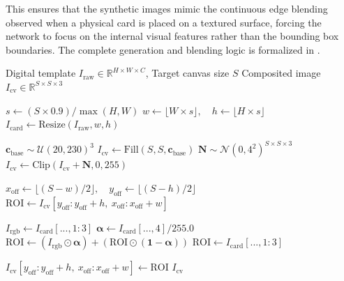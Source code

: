 This ensures that the synthetic images mimic the continuous edge blending observed when a physical card is placed on a textured surface, forcing the network to focus on the internal visual features rather than the bounding box boundaries. The complete generation and blending logic is formalized in .
\begin{algorithm}[htbp]
    \caption{Stochastic Background Generation and Alpha Compositing}
    \label{alg:alpha_blend}
    \begin{algorithmic}[1]
    \Require Digital template $I_{\text{raw}} \in \mathbb{R}^{H \times W \times C}$, Target canvas size $S$
    \Ensure Composited image $I_{\text{cv}} \in \mathbb{R}^{S \times S \times 3}$

    \State $s \gets (S \times 0.9) / \max(H, W)$ 
    \State $w \gets \lfloor W \times s \rfloor, \quad h \gets \lfloor H \times s \rfloor$
    \State $I_{\text{card}} \gets \text{Resize}(I_{\text{raw}}, w, h)$

    \State $\mathbf{c}_{\text{base}} \sim \mathcal{U}(20, 230)^{3}$ 
    \State $I_{\text{cv}} \gets \text{Fill}(S, S, \mathbf{c}_{\text{base}})$
    \State $\mathbf{N} \sim \mathcal{N}(0, 4^{2})^{S \times S \times 3}$ 
    \State $I_{\text{cv}} \gets \text{Clip}(I_{\text{cv}} + \mathbf{N}, 0, 255)$

    \State $x_{\text{off}} \gets \lfloor(S - w) / 2\rfloor, \quad y_{\text{off}} \gets \lfloor(S - h) / 2\rfloor$
    \State $\text{ROI} \gets I_{\text{cv}}[y_{\text{off}} : y_{\text{off}} + h,\ x_{\text{off}} : x_{\text{off}} + w]$

     
        \State $I_{\text{rgb}} \gets I_{\text{card}}[..., 1:3]$
        \State $\bm{\alpha} \gets I_{\text{card}}[..., 4] / 255.0$ 
        \State $\text{ROI} \gets (I_{\text{rgb}} \odot \bm{\alpha}) + (\text{ROI} \odot (\mathbf{1} - \bm{\alpha}))$ 
    \Else
        \State $\text{ROI} \gets I_{\text{card}}[..., 1:3]$ 
    \EndIf

    \State $I_{\text{cv}}[y_{\text{off}} : y_{\text{off}} + h,\ x_{\text{off}} : x_{\text{off}} + w] \gets \text{ROI}$
    \State \Return $I_{\text{cv}}$
    \end{algorithmic}
\end{algorithm}

